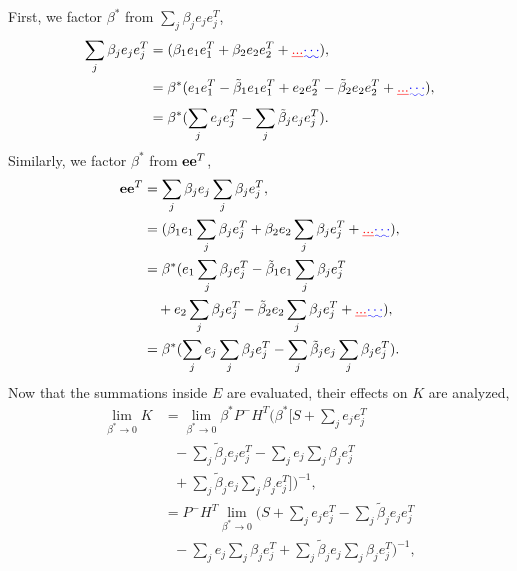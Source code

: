 \documentclass[letterpaper, 10pt, conference]{ieeeconf}
\providecommand{\DIFadd}[1]{{\protect\color{blue}\uwave{#1}}} %
\providecommand{\DIFdel}[1]{{\protect\color{red}\sout{#1}}}                      %
\providecommand{\DIFaddbegin}{} %
\providecommand{\DIFaddend}{} %
\providecommand{\DIFdelbegin}{} %
\providecommand{\DIFdelend}{} %
\begin{document}
\begin{appendix}
First, we factor $\beta^*$ from $\sum\limits_{j} \beta_{j}e_{j}e_{j}^T$,
\begin{align}
\sum\limits_{j} \beta_{j}e_{j}e_{j}^T&=(\beta_1e_1e_1^T+\beta_2e_2e_2^T+\DIFdelbegin \DIFdel{...}\DIFdelend \DIFaddbegin \DIFadd{\cdots}\DIFaddend ),\nonumber
\\
&=\beta^*
(e_1e_1^T-\tilde\beta_1e_1e_1^T+
e_2e_2^T-\tilde\beta_2e_2e_2^T+\DIFdelbegin \DIFdel{...}\DIFdelend \DIFaddbegin \DIFadd{\cdots}\DIFaddend ),\nonumber
\\
&=\beta^*(\sum\limits_{j}e_{j}e_{j}^T-\sum\limits_{j}\tilde\beta_je_{j}e_{j}^T).
\end{align}
Similarly, we factor $\beta^*$ from ${{\bf{e}}}{\bf{e}}^T$,
\begin{align}
{{\bf{e}}}{\bf{e}}^T&=\sum\limits_{j} \beta_{j}e_{j}\sum\limits_{j} \beta_{j}e_{j}^T,\nonumber
\\
&=
(\beta_1e_1\sum\limits_{j} \beta_{j}e_{j}^T+\beta_2e_2\sum\limits_{j} \beta_{j}e_{j}^T+\DIFdelbegin \DIFdel{...}\DIFdelend \DIFaddbegin \DIFadd{\cdots}\DIFaddend ),\nonumber
\\
&=\beta^*(e_1\sum\limits_{j} \beta_{j}e_{j}^T-\tilde\beta_1e_1\sum\limits_{j} \beta_{j}e_{j}^T\nonumber
\\
&\ \ \ +e_2\sum\limits_{j} \beta_{j}e_{j}^T-\tilde\beta_2e_2\sum\limits_{j} \beta_{j}e_{j}^T+\DIFdelbegin \DIFdel{...}\DIFdelend \DIFaddbegin \DIFadd{\cdots}\DIFaddend ),\nonumber
\\
&=\beta^*(\sum\limits_{j}e_{j}\sum\limits_{j}\beta_je_{j}^T-\sum\limits_{j}\tilde\beta_je_{j}\sum\limits_{j}\beta_je_{j}^T).
\end{align}
Now that the summations inside $E$ are evaluated, their effects on $K$ are analyzed,
\begin{align}
\lim_{\beta^* \to 0}K&=\lim_{\beta^* \to 0}\beta^*P^-H^T
(\beta^*[S+\sum\limits_{j}e_{j}e_{j}^T\nonumber
\\
&\ \ \ -\sum\limits_{j}\tilde\beta_je_{j}e_{j}^T
-\sum\limits_{j}e_{j}\sum\limits_{j}\beta_je_{j}^T\nonumber
\\
&\ \ \ +\sum\limits_{j}\tilde\beta_je_{j}\sum\limits_{j}\beta_je_{j}^T])^{-1},\nonumber
\\
&=P^-H^T\lim_{\beta^* \to 0}
(S+\sum\limits_{j}e_{j}e_{j}^T-\sum\limits_{j}\tilde\beta_je_{j}e_{j}^T\nonumber
\\
&\ \ \ -\sum\limits_{j}e_{j}\sum\limits_{j}\beta_je_{j}^T+\sum\limits_{j}\tilde\beta_je_{j}\sum\limits_{j}\beta_je_{j}^T)^{-1},
\label{eqn:OptGainNoSingularity}
\end{align}

\end{appendix}
\end{document}
